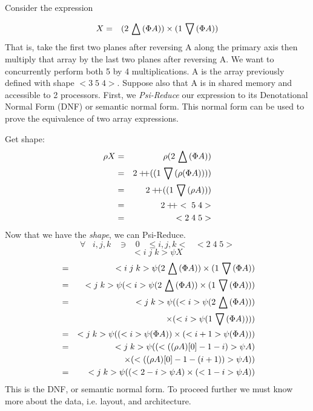 
Consider the expression

\begin{eqnarray}
X & = & (2 \,\bigtriangleup\, ( \Phi A)) \times ( 1 \,\bigtriangledown\, (\Phi A)) 
\end{eqnarray}
That is, take the first two planes after reversing A along the primary axis then multiply that array by the last two 
planes after reversing A. We want to concurrently perform both 5 by 4 multiplications. 
A is the array previously defined with shape $<3\;5\;4>$.
Suppose also that A is in shared memory and accessible to 2 processors.
First, we {\em Psi-Reduce} our expression to its Denotational Normal Form (DNF) or semantic 
normal form. This normal form can be used to prove the equivalence of  two array expressions.

Get shape: 
\begin{eqnarray}
\rho X & = & \rho (2 \take (\Phi A)) \nonumber \\
& = & 2 \cat ((1\drop (\rho ( \Phi A)))) \nonumber \\
&=& 2 \cat ((1 \drop (\rho  A))) \nonumber \\
&=& 2 \cat <\;5\;4> \nonumber \\
&=& <2\;4\;5>
\end{eqnarray}
Now that we have the {\em shape}, we can {Psi-Reduce}.
\[ \forall \;\;\; i,j,k \;\;\; \ni \;\;\; 0 \;\;\;\leq i,j,k < \;\;\;<2\;4\;5> \]
\[<i\;j\;k> \psi X \]
\begin{eqnarray}
& =&<i\;j\;k> \psi (2 \,\bigtriangleup\, ( \Phi A)) \times ( 1 \,\bigtriangledown\, (\Phi A)) \nonumber \\
&=&<j\;k> \psi (<i> \psi (2 \,\bigtriangleup\, ( \Phi A)) \times ( 1 \,\bigtriangledown\, (\Phi A)) )\nonumber \\
&= &<j\;k> \psi ((<i> \psi ( 2 \,\bigtriangleup\, (\Phi A))) \nonumber \\
&&\;\;\;\;\;\times ( <i> \psi ( 1 \,\bigtriangledown\, (\Phi A)))) \nonumber \\
&= &<j\;k> \psi (( <i> \psi (\Phi A)) \times (<i+1> \psi (\Phi A))) \nonumber \\
&=&<j\;k> \psi ((<((\rho A)[0] - 1 - i)> \psi A ) \nonumber \\
&& \;\;\;\;\;\times  (<((\rho A)[0] - 1 -( i + 1))> \psi A ) )\nonumber \\
&=&<j\;k> \psi ((< 2-i> \psi A ) \times (<1-i>  \psi A) )
 \end{eqnarray}
\normalsize
This is the DNF, or semantic normal form. To proceed further we must know more about the data, i.e. layout, and architecture. 
